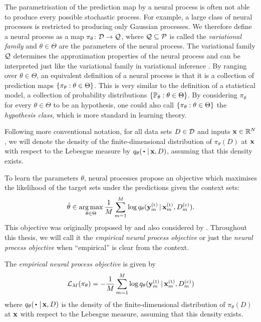 \documentclass[12pt, twoside]{report}
\begin{document}
The parametrisation of the prediction map by a neural process is often not able to produce every possible stochastic process. 
For example, a large class of neural processes is restricted to producing only Gaussian processes.
We therefore define a neural process as a map $\pi_\theta \colon \mathcal{D} \to \mathcal{Q}$, where $\mathcal{Q} \subseteq \mathcal{P}$ is called the \emph{variational family} and $\theta \in \Theta$ are the parameters of the neural process.
The variational family $\mathcal{Q}$ determines the approximation properties of the neural process and can be interpreted just like the variational family in variational inference \parencite{Wainwright:2008:Graphical_Models_Exponential_Families_and}.
By ranging over $\theta \in \Theta$, an equivalent definition of a neural process is that it is a collection of prediction maps $\{\pi_\theta : \theta \in \Theta\}$.
This is very similar to the definition of a statistical model, a collection of probability distributions $\{\mathbb{P}_\theta : \theta \in \Theta\}$.
By considering $\pi_\theta$ for every $\theta \in \Theta$ to be an hypothesis, one could also call $\{\pi_\theta : \theta \in \Theta\}$ the \emph{hypothesis class}, which is more standard in learning theory.

Following more conventional notation, for all data sets $D \in \mathcal{D}$ and inputs $\mathbf{x} \in \mathbb{R}^N$,
we will denote the 
density of the finite-dimensional distribution of $\pi_\theta(D)$ at $\mathbf{x}$ with respect to the Lebesgue measure by $q_\theta(\vardot \cond \vx, D)$, assuming that this density exists.

To learn the parameters $\theta$, neural processes propose an objective which maximises the likelihood of the target sets under the predictions given the context sets:
\begin{equation}
    \hat\theta 
    \in
    \argmax_{\theta \in \Theta} \frac1M \sum_{m=1}^M \log q_\theta(\vy\us{(t)}_m \cond \vx\us{(t)}_m, D\us{(c)}_m).
\end{equation}
This objective was originally proposed by \textcite{Garnelo:2018:Conditional_Neural_Processes} and also considered by \textcite{Gordon:2019:Meta-Learning_Probabilistic_Inference_for_Prediction}.
Throughout this thesis, we will call it the \emph{empirical neural process objective} or just the \emph{neural process objective} when ``empirical'' is clear from the context.

\begin{definition}
    \label{def:empirical_neural_process_objective}
    The \emph{empirical neural process objective} is given by
    \begin{equation}
        \L_M(\pi_\theta) = -\frac1M \sum_{m=1}^M \log q_\theta(\vy\us{(t)}_m \cond \vx\us{(t)}_m, D\us{(c)}_m)
    \end{equation}
    where $q_\theta(\vardot \cond \vx, D)$
    is the density of the finite-dimensional distribution of $\pi_\theta(D)$ at $\mathbf{x}$ with respect to the Lebesgue measure, assuming that this density exists.
\end{definition}
\end{document}
